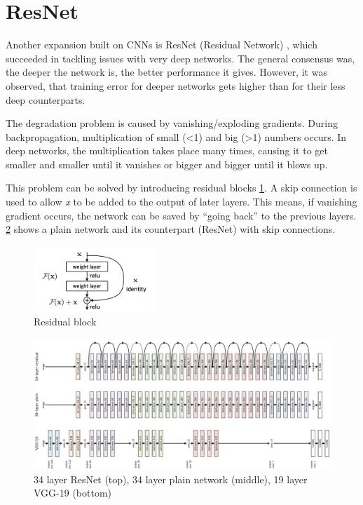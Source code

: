 \section{ResNet}
Another expansion built on CNNs is ResNet (Residual Network) \cite{resnet2016}, which succeeded in tackling issues with very deep networks. The general consensus was, the deeper the network is, the better performance it gives. However, it was observed, that training error for deeper networks gets higher than for their less deep counterparts. 

The degradation problem is caused by vanishing/exploding gradients. During backpropagation, multiplication of small (<1) and big (>1) numbers occurs. In deep networks, the multiplication takes place many times, causing it to get smaller and smaller until it vanishes or bigger and bigger until it blows up.

This problem can be solved by introducing residual blocks \ref{fig:res-block}. A skip connection is used to allow \textit{x} to be added to the output of later layers. This means, if vanishing gradient occurs, the network can be saved by ``going back'' to the previous layers. \ref{fig:resnet} shows a plain network and its counterpart (ResNet) with skip connections.

\begin{figure}[ht!]
    \centering
    \includegraphics[width=130pt]{images/residual-block.png}
    \caption[Residual block]{Residual block \cite{resnet2016}}
    \label{fig:res-block}
\end{figure}

\begin{figure}[ht!]
    \centering
    \includegraphics[width=350pt]{images/resnet.png}
    \caption[ResNet architecture]{ 34 layer ResNet (top), 34 layer plain network (middle), 19 layer VGG-19 (bottom)\cite{resnet2016}}
    \label{fig:resnet}
\end{figure}

\pagebreak